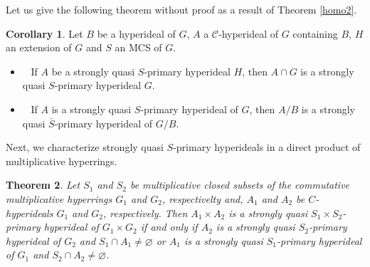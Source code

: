 \documentclass[preprint,review,10pt]{amsart}
\newtheorem{theorem}{Theorem}[section]
\theoremstyle{definition}
\newtheorem{corollary}[theorem]{Corollary}
\theoremstyle{remark}
\numberwithin{equation}{section}
\begin{document}
Let us give the following theorem without proof as a result of Theorem \ref{homo2}.
\begin{corollary}
Let $B$ be a hyperideal of $G$, $A$     a $\mathcal{C}$-hyperideal  of $G$ containing   $B$,  $  H$  an extension of $G$ and $S$  an MCS of $G$.
\begin{itemize}
\item[\rm{(i)}]~  If $A$ be a strongly quasi $S$-primary  hyperideal $H$, then $A \cap G$ is a strongly quasi $S$-primary  hyperideal $G$.

\item[\rm{(ii)}]~    If $A$ is a strongly quasi $S$-primary  hyperideal of $G$, then $A/B$   is a strongly quasi $\bar{S}$-primary  hyperideal of $G/B$.
\end{itemize}
\end{corollary}
Next, we characterize strongly quasi $S$-primary hyperideals in a direct product of multiplicative hyperrings.
\begin{theorem} \label{cart}
Let   $S_1$ and $S_2$ be multiplicative closed subsets of  the commutative multiplicative hyperrings $G_1$ and $G_2$, respectivelty and,   $A_1$ and $A_2$ be $C$-hyperideals $G_1$ and $G_2$, respectively. Then $A_1 \times A_2$ is a strongly quasi $S_1 \times S_2$-primary hyperideal of $G_1 \times G_2$  if and only if   $A_2$ is a strongly quasi $S_2$-primary hyperideal of $G_2$ and $S_1 \cap A_1 \neq \varnothing$  or  $A_1$ is a strongly quasi $S_1$-primary hyperideal of $G_1$ and $S_2 \cap A_2 \neq \varnothing$.
\end{theorem}
\end{document}

